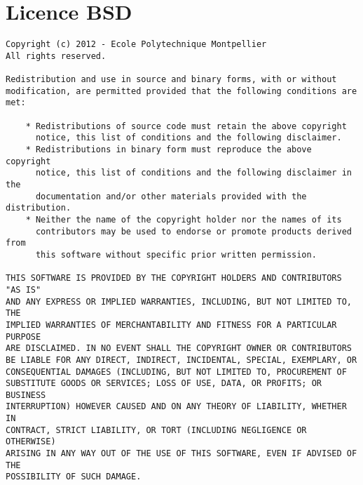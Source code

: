 \chapter{Licence BSD}

\begin{verbatim}
Copyright (c) 2012 - Ecole Polytechnique Montpellier
All rights reserved.

Redistribution and use in source and binary forms, with or without
modification, are permitted provided that the following conditions are met:

    * Redistributions of source code must retain the above copyright 
      notice, this list of conditions and the following disclaimer.
    * Redistributions in binary form must reproduce the above copyright 
      notice, this list of conditions and the following disclaimer in the 
      documentation and/or other materials provided with the distribution.
    * Neither the name of the copyright holder nor the names of its 
      contributors may be used to endorse or promote products derived from 
      this software without specific prior written permission.

THIS SOFTWARE IS PROVIDED BY THE COPYRIGHT HOLDERS AND CONTRIBUTORS "AS IS" 
AND ANY EXPRESS OR IMPLIED WARRANTIES, INCLUDING, BUT NOT LIMITED TO, THE 
IMPLIED WARRANTIES OF MERCHANTABILITY AND FITNESS FOR A PARTICULAR PURPOSE 
ARE DISCLAIMED. IN NO EVENT SHALL THE COPYRIGHT OWNER OR CONTRIBUTORS
BE LIABLE FOR ANY DIRECT, INDIRECT, INCIDENTAL, SPECIAL, EXEMPLARY, OR 
CONSEQUENTIAL DAMAGES (INCLUDING, BUT NOT LIMITED TO, PROCUREMENT OF 
SUBSTITUTE GOODS OR SERVICES; LOSS OF USE, DATA, OR PROFITS; OR BUSINESS 
INTERRUPTION) HOWEVER CAUSED AND ON ANY THEORY OF LIABILITY, WHETHER IN 
CONTRACT, STRICT LIABILITY, OR TORT (INCLUDING NEGLIGENCE OR OTHERWISE) 
ARISING IN ANY WAY OUT OF THE USE OF THIS SOFTWARE, EVEN IF ADVISED OF THE 
POSSIBILITY OF SUCH DAMAGE.
\end{verbatim}
